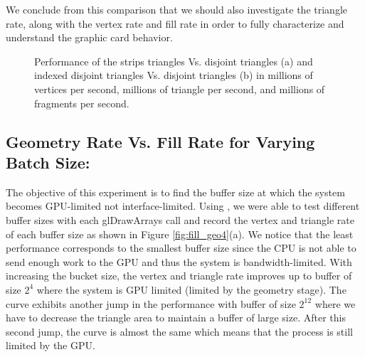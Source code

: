 We conclude from this comparison that we should also investigate the triangle rate, along with the vertex rate and fill rate in order to fully characterize and understand the graphic card behavior.
\begin{figure}[!tbh]
 \centering  
  \caption{Performance of the strips triangles Vs. disjoint triangles (a) and indexed disjoint triangles Vs. disjoint triangles (b) in millions of vertices per second, millions of triangle per second, and millions of fragments per second. }
   \label{fig:fill_geo3}
\end{figure} 


\subsection{Geometry Rate Vs. Fill Rate for Varying Batch Size:}
The objective of this experiment is to find the buffer size at which the system becomes GPU-limited not interface-limited. Using \protect{\wes}, we were able to test different buffer sizes with each {\selectfont glDrawArrays} call and record the vertex and triangle rate of each buffer size as shown in Figure \ref{fig:fill_geo4}(a). We notice that the least performance corresponds to the smallest buffer size since the CPU is not able to send enough work to the GPU and thus the system is bandwidth-limited. With increasing the bucket size, the vertex and triangle rate improves up to buffer of size $2^{4}$ where the system is GPU limited (limited by the geometry stage). The curve exhibits another jump in the performance with buffer of size $2^{12}$ where we have to decrease the triangle area to maintain a buffer of large size. After this second jump, the curve is almost the same which means that the process is still limited by the GPU. 

